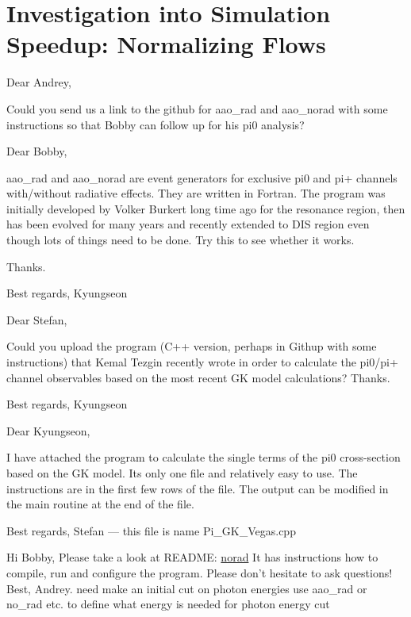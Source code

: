 \section{Investigation into Simulation Speedup: Normalizing Flows}


    Dear Andrey,
    
    Could you send us a link to the github for aao\_rad and aao\_norad with some instructions so that Bobby can follow up for his pi0 analysis?  
    
    Dear Bobby,
    
    aao\_rad and aao\_norad are event generators for exclusive pi0 and pi+ channels with/without radiative effects.  They are written in Fortran.  The program was initially developed by Volker Burkert long time ago for the resonance region, then has been evolved for many years and recently extended to DIS region even though lots of things need to be done.  Try this to see whether it works.  
    
    Thanks.
    
    Best regards, Kyungseon
    
    
    Dear Stefan,
    
    Could you upload the program (C++ version, perhaps in Githup with some instructions) that Kemal Tezgin recently wrote in order to calculate the pi0/pi+ channel observables based on the most recent GK model calculations?  Thanks.
    
    Best regards, Kyungseon
    
    
    Dear Kyungseon,
    
    I have attached the program to calculate the single terms of the pi0 
    cross-section based on the GK model.
    Its only one file and relatively easy to use. The instructions are in 
    the first few rows of the file.
    The output can be modified in the main routine at the end of the file.
    
    Best regards,
    Stefan --- this file is name Pi\_GK\_Vegas.cpp
    
    
    Hi Bobby,
    Please take a look at README:
    \href{https://github.com/drewkenjo/aao\_norad}{norad}
    It has instructions how to compile, run and configure the program.
    Please don't hesitate to ask questions!
    Best,
    Andrey.
    need make an initial cut on photon energies
    use aao\_rad or no\_rad etc. to define what energy is needed for photon energy cut


